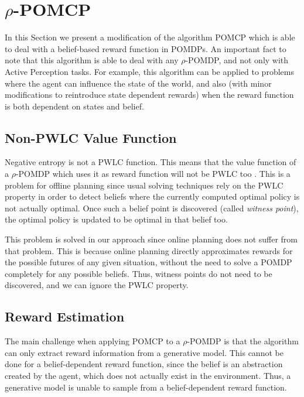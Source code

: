\section{$\rho$-POMCP}

In this Section we present a modification of the algorithm POMCP which is able to deal with a
belief-based reward function in POMDPs. An important fact to note that this algorithm is able to
deal with any $\rho$-POMDP, and not only with Active Perception tasks. For example, this algorithm
can be applied to problems where the agent can influence the state of the world, and also (with
minor modifications to reintroduce state dependent rewards) when the reward function is both
dependent on states and belief.

\subsection{Non-PWLC Value Function}

Negative entropy is not a PWLC function. This means that the value function of a $\rho$-POMDP which
uses it as reward function will not be PWLC too \cite{cit:rpomdp}. This is a problem for offline
planning since usual solving techniques rely on the PWLC property in order to detect beliefs where
the currently computed optimal policy is not actually optimal. Once such a belief point is
discovered (called \textit{witness point}), the optimal policy is updated to be optimal in that
belief too.

This problem is solved in our approach since online planning does not suffer from that problem. This
is because online planning directly approximates rewards for the possible futures of any given
situation, without the need to solve a POMDP completely for any possible beliefs. Thus, witness
points do not need to be discovered, and we can ignore the PWLC property.

\subsection{Reward Estimation}

The main challenge when applying POMCP to a $\rho$-POMDP is that the algorithm can only extract
reward information from a generative model. This cannot be done for a belief-dependent reward
function, since the belief is an abstraction created by the agent, which does not actually exist in
the environment.  Thus, a generative model is unable to sample from a belief-dependent reward
function.

